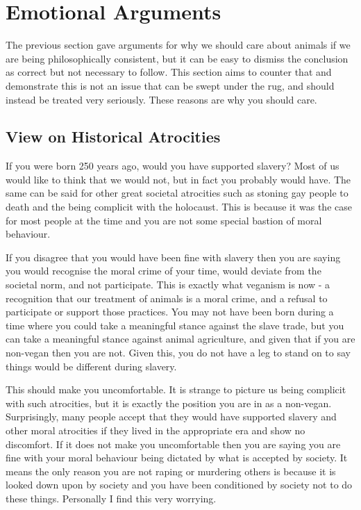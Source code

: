 
\section{Emotional Arguments}
\label{sec:EmotionalArguments}

The previous section gave arguments for why we should care about animals if we are being philosophically consistent, but it can be easy to dismiss the conclusion as correct but not necessary to follow. This section aims to counter that and demonstrate this is not an issue that can be swept under the rug, and should instead be treated very seriously. These reasons are why you should care.

\subsection{View on Historical Atrocities}

If you were born 250 years ago, would you have supported slavery? Most of us would like to think that we would not, but in fact you probably would have. The same can be said for other great societal atrocities such as stoning gay people to death and the being complicit with the holocaust. This is because it was the case for most people at the time and you are not some special bastion of moral behaviour.

If you disagree that you would have been fine with slavery then you are saying you would recognise the moral crime of your time, would deviate from the societal norm, and not participate. This is exactly what veganism is now - a recognition that our treatment of animals is a moral crime, and a refusal to participate or support those practices. You may not have been born during a time where you could take a meaningful stance against the slave trade, but you can take a meaningful stance against animal agriculture, and given that if you are non-vegan then you are not. Given this, you do not have a leg to stand on to say things would be different during slavery.

This should make you uncomfortable. It is strange to picture us being complicit with such atrocities, but it is exactly the position you are in as a non-vegan. Surprisingly, many people accept that they would have supported slavery and other moral atrocities if they lived in the appropriate era and show no discomfort. If it does not make you uncomfortable then you are saying you are fine with your moral behaviour being dictated by what is accepted by society. It means the only reason you are not raping or murdering others is because it is looked down upon by society and you have been conditioned by society not to do these things. Personally I find this very worrying.

